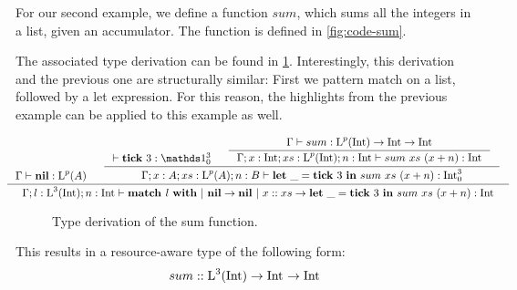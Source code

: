 \begin{example}
   For our second example, we define a function \(sum\), which sums all the integers in a list, given an accumulator. The function is defined in \cref{fig:code-sum}.

The associated type derivation can be found in \cref{fig:type-derivation-sum}. Interestingly, this derivation and the previous one are structurally similar: First we pattern match on a list, followed by a let expression. For this reason, the highlights from the previous example can be applied to this example as well.

\begin{figure}[H]
\begin{center}
   \[
      \hspace*{-1.5cm}
      \inference
      {
         \typing{\Gamma}{\listnil}{\ralist{p}{A}}
         &
         \inference
         {
            \typing{}{\tick{3}}{\ratype{\unit}{3}{0}}
            &
            \inference
            {
               \typing{\Gamma}{sum}{\ralist{p}{\typeint} \to \typeint \to \typeint}
            }
            {
               \typing
               {\Gamma;x:\typeint;xs:\ralist{p}{\typeint};n:\typeint}
               {sum~xs~(x+n)}
               {\typeint}
            }
         }
         {
            \typing
            {\Gamma;x:A;xs:\ralist{p}{A};n:B}
            {\letexp{\_}{\tick{3}}{sum~xs~(x+n)}}
            {\ratype{\typeint}{3}{0}}
         }
      }
      {
         \typing
         {\Gamma;l:\ralist{3}{\typeint};n:\typeint}
         {\listmatch{l}{\listnil}{\letexp{\_}{\tick{3}}{sum~xs~(x+n)}}}
         {\typeint}
      }
   \]
   \end{center}
   \caption{Type derivation of the sum function.}
   \label{fig:type-derivation-sum}
\end{figure}

This results in a resource-aware type of the following form:
\[
   sum :: \text{L}^{3}(\text{Int}) \to \text{Int} ^{}_{} \to \text{Int} ^{}_{}
\]
\end{example}

